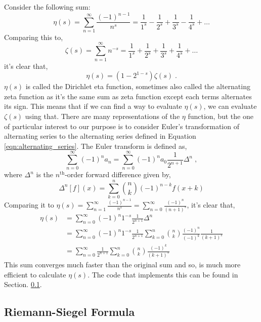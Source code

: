 \documentclass{amsproc}
\newcommand{\be}{\begin{equation}}
\newcommand{\ee}{\end{equation}}
\newtheorem{theorem}{Theorem}[section]
\theoremstyle{definition}
\theoremstyle{remark}
\numberwithin{equation}{section}
\begin{document}
Consider the following sum:
\be
\label{eqn:alternating_series}
\eta(s) = \sum_{n = 1}^{\infty} \frac{ (-1)^{n - 1} }{n^s} = \frac{1}{1^s} - \frac{1}{2^s} + \frac{1}{3^s} - \frac{1}{4^s} + \ldots
\ee
Comparing this to,
\begin{equation*}
 \zeta(s) = \sum_{n = 1}^{\infty} n^{-s} = \frac{1}{1^s} + \frac{1}{2^s} + \frac{1}{3^s} + \frac{1}{4^s} + \ldots
\end{equation*}
it's clear that,
\be
\eta(s) = \left( 1 - 2^{1 - s} \right) \zeta(s) \;.
\ee
$\eta(s)$ is called the Dirichlet eta function, sometimes also called the alternating zeta function as it's the same sum as zeta function except each terms alternates its sign. This means that if we can find a way to evaluate $\eta(s)$, we can evaluate $\zeta(s)$ using that. There are many representations of the $\eta$ function, but the one of particular interest to our purpose is to consider Euler's transformation of alternating series to the alternating series defined in Equation \ref{eqn:alternating_series}. The Euler transform is defined as,
\be
\sum_{n = 0}^{\infty} (-1)^n a_n = \sum_{n = 0}^{\infty} (-1)^n a_0 \frac{ 1 }{2^{n + 1}} \Delta^n \;,
\ee
where $\Delta^n$ is the $n^{\mathrm{th}}$-order forward difference given by,
\begin{equation*}
 \Delta^n[f](x) = \sum_{k = 0}^{n} {n \choose k} (-1)^{n - k} f(x + k)
\end{equation*}
Comparing it to $\eta(s) = \sum_{n = 1}^{\infty} \frac{ (-1)^{n - 1} }{n^s} = \sum_{n = 0}^{\infty} \frac{ (-1)^n }{ (n + 1)^s }$, it's clear that,
\begin{align*}
\eta(s) &= \sum_{n=0}^{\infty} (-1)^n 1^{-s} \frac{1}{ 2^{n + 1} } \Delta^n \\
        &= \sum_{n=0}^{\infty} (-1)^n 1^{-s} \frac{1}{ 2^{n + 1} } \sum_{k=0}^{n} {n \choose k} \frac{ (-1)^n }{ (-1)^k } \frac{1}{ (k + 1)^s } \\
        &= \sum_{n=0}^{\infty} \frac{1}{ 2^{n + 1} } \sum_{k=0}^{n} {n \choose k} \frac{ (-1)^k }{ (k + 1)^s }
\end{align*}
This sum converges much faster than the original sum and so, is much more efficient to calculate $\eta(s)$. The code that implements this can be found in Section. \ref{}. 

\subsection{Riemann-Siegel Formula}

\end{document}
